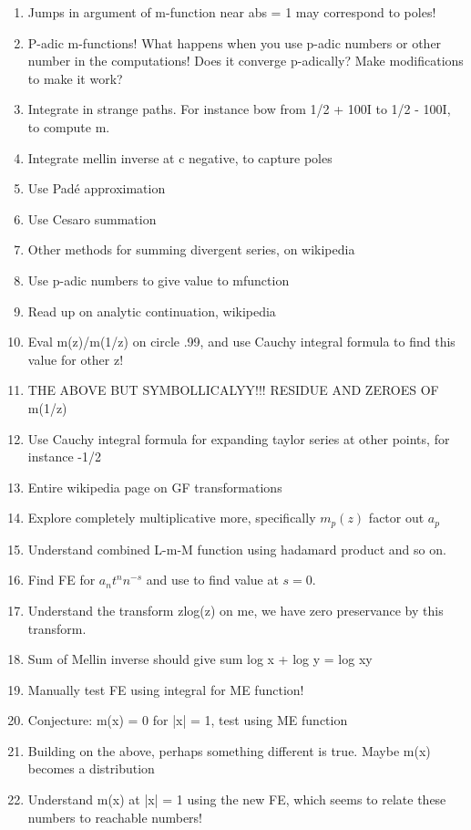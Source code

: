 \documentclass[a4paper]{amsart}
\begin{document}
\begin{enumerate}
  \item Jumps in argument of m-function near abs = 1 may correspond to poles!
  \item P-adic m-functions! What happens when you use p-adic numbers or other number in the computations! Does it converge p-adically? Make modifications to make it work?
  \item Integrate in strange paths. For instance bow from 1/2 + 100I to 1/2 - 100I, to compute m.
  \item Integrate mellin inverse at c negative, to capture poles
  \item Use Padé approximation
  \item Use Cesaro summation
  \item Other methods for summing divergent series, on wikipedia
  \item Use p-adic numbers to give value to mfunction
  \item Read up on analytic continuation, wikipedia
  \item Eval m(z)/m(1/z) on circle .99, and use Cauchy integral formula to find this value for other z!
  \item THE ABOVE BUT SYMBOLLICALYY!!! RESIDUE AND ZEROES OF m(1/z)
  \item Use Cauchy integral formula for expanding taylor series at other points, for instance -1/2
  \item Entire wikipedia page on GF transformations
  \item Explore completely multiplicative more, specifically $m_p(z)$ factor out $a_p$
  \item Understand combined L-m-M function using hadamard product and so on.
  \item Find FE for $a_nt^nn^{-s}$ and use to find value at $s = 0$.
  \item Understand the transform zlog(z) on me, we have zero preservance by this transform.
  \item Sum of Mellin inverse should give sum log x + log y = log xy
  \item Manually test FE using integral for ME function!
  \item Conjecture: m(x) = 0 for |x| = 1, test using ME function
  \item Building on the above, perhaps something different is true. Maybe m(x) becomes a distribution
  \item Understand m(x) at |x| = 1 using the new FE, which seems to relate these numbers to reachable numbers!

\end{enumerate}
\end{document}
